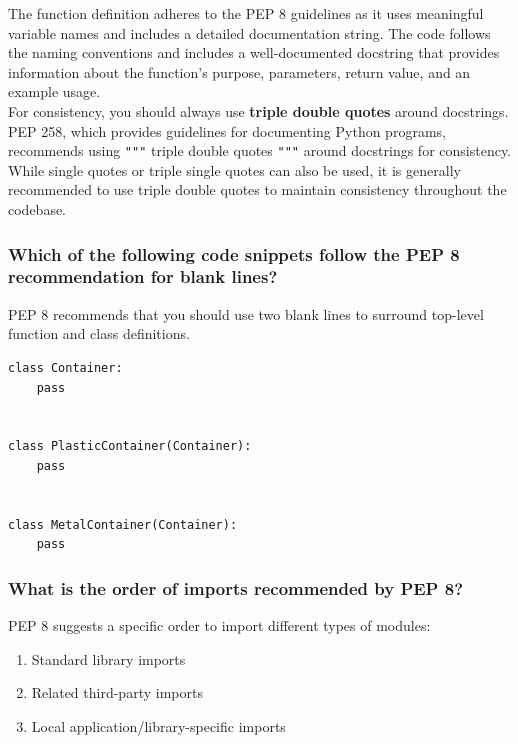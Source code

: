 The function definition adheres to the PEP 8 guidelines as it uses meaningful variable names and includes a detailed documentation string.  The code follows the naming conventions and includes a well-documented docstring that provides information about the function's purpose, parameters, return value, and an example usage.\\

For consistency, you should always use \textbf{triple double quotes} around docstrings. PEP 258, which provides guidelines for documenting Python programs, recommends using \texttt{"""} triple double quotes \texttt{"""} around docstrings for consistency. While single quotes or triple single quotes can also be used, it is generally recommended to use triple double quotes to maintain consistency throughout the codebase.

\subsubsection{Which of the following code snippets follow the PEP 8 recommendation for blank lines?}
PEP 8 recommends that you should use two blank lines to surround top-level function and class definitions.

\begin{codebox}
\begin{verbatim}
class Container:
    pass
 

class PlasticContainer(Container):
    pass
 

class MetalContainer(Container):
    pass
\end{verbatim}
\end{codebox}

\newpage
\subsubsection{What is the order of imports recommended by PEP 8?}
PEP 8 suggests a specific order to import different types of modules:
\begin{enumerate}
    \item Standard library imports
    \item Related third-party imports
    \item Local application/library-specific imports
\end{enumerate}

